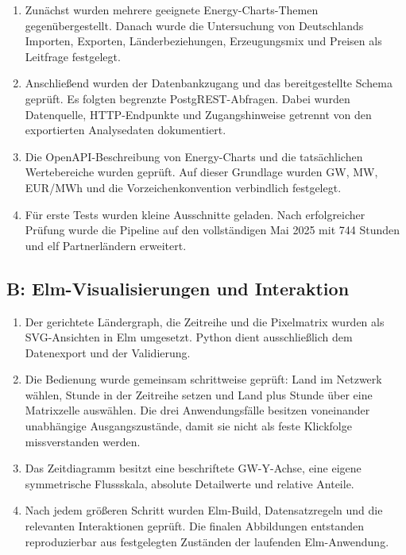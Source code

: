 \begin{enumerate}
  \item Zunächst wurden mehrere geeignete Energy-Charts-Themen gegenübergestellt.
    Danach wurde die Untersuchung von Deutschlands Importen, Exporten,
    Länderbeziehungen, Erzeugungsmix und Preisen als Leitfrage festgelegt.
  \item Anschlie{\ss}end wurden der Datenbankzugang und das bereitgestellte Schema
     geprüft. Es folgten begrenzte PostgREST-Abfragen. Dabei
    wurden Datenquelle, HTTP-Endpunkte und Zugangshinweise getrennt von den
    exportierten Analysedaten dokumentiert.
  \item Die OpenAPI-Beschreibung von Energy-Charts und die tatsächlichen
    Wertebereiche wurden geprüft. Auf dieser Grundlage wurden GW, MW, EUR/MWh
    und die Vorzeichenkonvention verbindlich festgelegt.
  \item Für erste Tests wurden kleine Ausschnitte geladen. Nach erfolgreicher
    Prüfung wurde die Pipeline auf den vollständigen Mai 2025 mit 744 Stunden
    und elf Partnerländern erweitert.
\end{enumerate}

\subsection*{B: Elm-Visualisierungen und Interaktion}

\begin{enumerate}
  \item Der gerichtete Ländergraph, die Zeitreihe und die Pixelmatrix wurden als
    SVG-Ansichten in Elm umgesetzt. Python dient ausschlie{\ss}lich dem
    Datenexport und der Validierung.
  \item Die Bedienung wurde gemeinsam schrittweise geprüft: Land im Netzwerk
    wählen, Stunde in der Zeitreihe setzen und Land plus Stunde über eine
    Matrixzelle auswählen. Die drei Anwendungsfälle besitzen voneinander
    unabhängige Ausgangszustände, damit sie nicht als feste Klickfolge
    missverstanden werden.
  \item Das Zeitdiagramm besitzt eine beschriftete GW-Y-Achse, eine eigene
    symmetrische Flussskala, absolute Detailwerte und relative Anteile.
  \item Nach jedem grö{\ss}eren Schritt wurden Elm-Build, Datensatzregeln und die
    relevanten Interaktionen geprüft. Die finalen Abbildungen entstanden
    reproduzierbar aus festgelegten Zuständen der laufenden Elm-Anwendung.
\end{enumerate}

